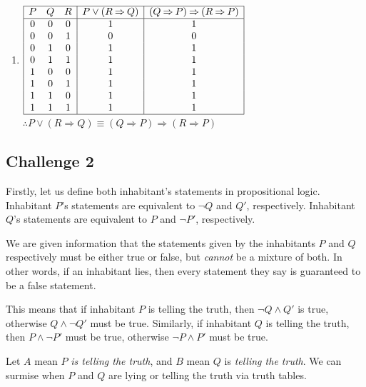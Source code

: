\documentclass[12pt]{article}
\newcommand{\impl}{\mathbin{\Rightarrow}}
\begin{document}
\begin{enumerate}
\item
$\begin{array}{|ccc|c|c|}
   \hline
   P & Q & R & P \lor (R \impl Q) & (Q \impl P) \impl (R \impl P)
\\ \hline
    0 & 0 & 0 & 1 & 1
\\ 0 & 0 & 1 & 0 & 0
\\ 0 & 1 & 0 & 1 & 1
\\ 0 & 1 & 1 & 1 & 1
\\ 1 & 0 & 0 & 1 & 1
\\ 1 & 0 & 1 & 1 & 1
\\ 1 & 1 & 0 & 1 & 1
\\ 1 & 1 & 1 & 1 & 1
\\ \hline
\end{array}$
$\therefore P \lor (R \impl Q) \equiv (Q \impl P) \impl (R \impl P)$
\bigskip

\end{enumerate}


\subsection*{Challenge 2}

Firstly, let us define both inhabitant's statements in propositional logic.
Inhabitant $P$'s statements are equivalent to $\neg Q$ and $Q'$, respectively. 
Inhabitant $Q$'s statements are equivalent to $P$ and $\neg P'$, respectively.

\bigskip
\noindent
We are given information that the statements given by the inhabitants $P$ and $Q$ 
respectively must be either true or false, but \emph{cannot} be a mixture of both. 
In other words, if an inhabitant lies, then every statement they say is guaranteed to 
be a false statement.

\bigskip
\noindent
This means that if inhabitant $P$ is telling the truth, then $\neg Q \land Q'$ is true, 
otherwise $Q \land \neg Q'$ must be true. Similarly, if inhabitant $Q$ is telling the truth,
then $P \land \neg P'$ must be true, otherwise $\neg P \land P'$ must be true.


\bigskip
\noindent
Let $A$ mean $P$ \emph{is telling the truth}, and $B$ mean $Q$ is \emph{telling
the truth}. We can surmise when $P$ and $Q$ are lying or telling the truth via truth tables.
\end{document}
